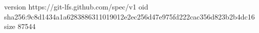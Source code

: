 version https://git-lfs.github.com/spec/v1
oid sha256:9c8d1434a1a6283886311019012e2ec256d47e975fd222cac356d823b2b4dc16
size 87544
